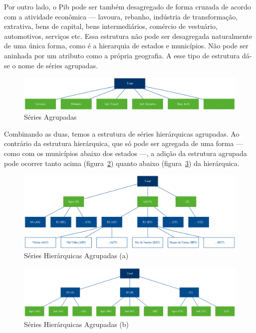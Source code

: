 \documentclass[
  12pt,
  letterpaper,
  DIV=11,
  numbers=noendperiod]{scrartcl}
\begin{document}
Por outro lado, o Pib pode ser também desagregado de forma cruzada de
acordo com a atividade econômica --- lavoura, rebanho, indústria de
transformação, extrativa, bens de capital, bens intermediários, comércio
de vestuário, automotivos, serviços etc. Essa estrutura não pode ser
desagregada naturalmente de uma única forma, como é a hierarquia de
estados e municípios. Não pode ser aninhada por um atributo como a
própria geografia. A esse tipo de estrutura dá-se o nome de séries
agrupadas.

\begin{figure}

{\centering \includegraphics{img/agrupadas.png}

}

\caption{\label{fig-a}Séries Agrupadas}

\end{figure}

Combinando as duas, temos a estrutura de séries hierárquicas agrupadas.
Ao contrário da estrutura hierárquica, que só pode ser agregada de uma
forma --- como com os municípios abaixo dos estados ---, a adição da
estrutura agrupada pode ocorrer tanto acima (figura~\ref{fig-ha1})
quanto abaixo (figura~\ref{fig-ha2}) da hierárquica.

\begin{figure}

{\centering \includegraphics{img/hier_agrup.png}

}

\caption{\label{fig-ha1}Séries Hierárquicas Agrupadas (a)}

\end{figure}

\begin{figure}

{\centering \includegraphics{img/hier_agrup_2.png}

}

\caption{\label{fig-ha2}Séries Hierárquicas Agrupadas (b)}

\end{figure}
\end{document}
